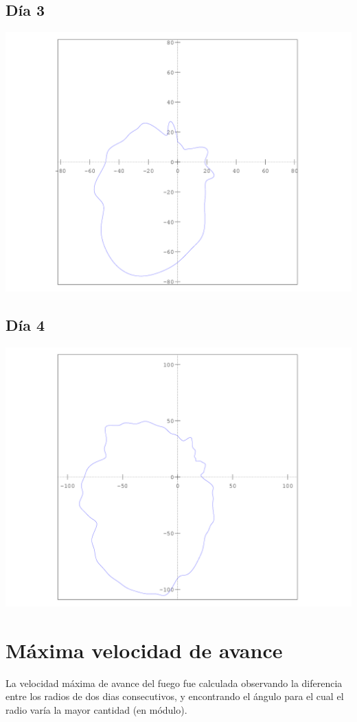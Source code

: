 \documentclass[12pt,spanish]{article}
\begin{document}
\subsection*{Día 3}
\includegraphics[scale=0.7]{../salida/dia3.png}
\subsection*{Día 4}
\includegraphics[scale=0.7]{../salida/dia4.png}

\section*{Máxima velocidad de avance}
La velocidad máxima de avance del fuego fue calculada observando la diferencia entre los radios de dos dias consecutivos, y encontrando el ángulo para el cual el radio varía la mayor cantidad (en módulo).
\end{document}
